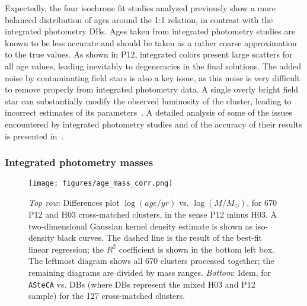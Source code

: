 \documentclass{aa}
\begin{document}
Expectedly, the four isochrone fit studies analyzed previously show a more
balanced distribution of ages around the 1:1 relation, in contrast with the
integrated photometry DBs. Ages taken from integrated photometry studies are
known to be less accurate and should be taken as a rather coarse approximation
to the true values.
%
As shown in P12, integrated colors present large scatters for all age values,
leading inevitably to degeneracies in the final solutions.
The added noise by contaminating field stars is also a key issue, as this noise is
very difficult to remove properly from integrated photometry data. A
single overly bright field star can substantially modify the observed
luminosity of the cluster, leading to incorrect estimates of its
parameters~\citep{Baumgardt_2013,Piatti_2014_B88}.
A detailed analysis of some of the issues encountered by integrated photometry
studies and of the accuracy of their results is presented in~\cite{Anders_2013}.



\subsubsection{Integrated photometry masses}
\label{sssec:integ_photom_masses}
%
%
%
%

\begin{figure*}
\centering
\texttt{[image: figures/age\_mass\_corr.png]}
\caption{\emph{Top row}: Differences plot $\log(age/yr)$ vs.
$\log(M/M_{\odot})$, for 670 P12 and H03 cross-matched clusters, in the sense
P12 minus H03.
A two-dimensional Gaussian kernel density estimate is shown as iso-density black
curves. The dashed line is the result of the best-fit linear regression;
the $R^2$ coefficient is shown in the bottom left box.
The leftmost diagram shows all 670 clusters processed together; the remaining
diagrams are divided by mass ranges.
\emph{Bottom}: Idem, for \texttt{ASteCA} vs. DBs (where DBs represent the
mixed H03 and P12 sample) for the 127 cross-matched clusters.}
\label{fig:age_mass_corr}
\end{figure*}
\end{document}
